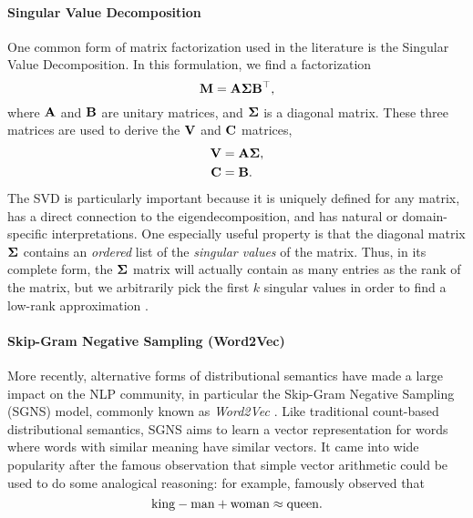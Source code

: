 \paragraph{Singular Value Decomposition}
One common form of matrix factorization used in the literature is the Singular
Value Decomposition. In this formulation, we find a factorization
\begin{equation*}
  {{\mathbf{M}}} = {{\mathbf{A}}}{\bf \Sigma}{{\mathbf{B}}}^{\top},
\end{equation*}
where ${{\mathbf{A}}}$ and ${{\mathbf{B}}}$ are unitary matrices, and ${\bf \Sigma}$ is a diagonal
matrix. These three matrices are used to derive the ${{\mathbf{V}}}$ and ${{\mathbf{C}}}$ matrices,
\begin{align*}
  {{\mathbf{V}}} & = {{\mathbf{A}}}{\bf \Sigma},\\
  {{\mathbf{C}}} & = {{\mathbf{B}}}.
\end{align*}
The SVD is particularly important because it is uniquely defined for any
matrix, has a direct connection to the eigendecomposition, and
has natural or domain-specific interpretations. One especially useful property is
that the diagonal matrix ${\bf \Sigma}$ contains an {\em ordered} list of the
{\em singular values} of the matrix. Thus, in its complete form, the ${\bf
\Sigma}$ matrix will actually contain as many entries as the rank of the
matrix, but we arbitrarily pick the first $k$ singular values in order to find
a low-rank approximation \cite{trefethen:1997:linalg}.

\paragraph{Skip-Gram Negative Sampling (Word2Vec)}
\label{sec:word2vec}

More recently, alternative forms of distributional semantics have made a large
impact on the NLP community, in particular the Skip-Gram Negative Sampling
(SGNS) model, commonly known as {\em Word2Vec} \cite{mikolov:2013:iclr}.
Like traditional count-based distributional semantics, SGNS aims to learn a
vector representation for words where words with similar meaning have
similar vectors. It came into wide popularity after the famous observation
that simple vector arithmetic could be used to do some analogical reasoning:
for example,  famously observed that
\begin{equation*}
  \mathbf{\text{king}} - \mathbf{\text{man}} + \mathbf{\text{woman}} \approx \mathbf{\text{queen}}.
\end{equation*}

